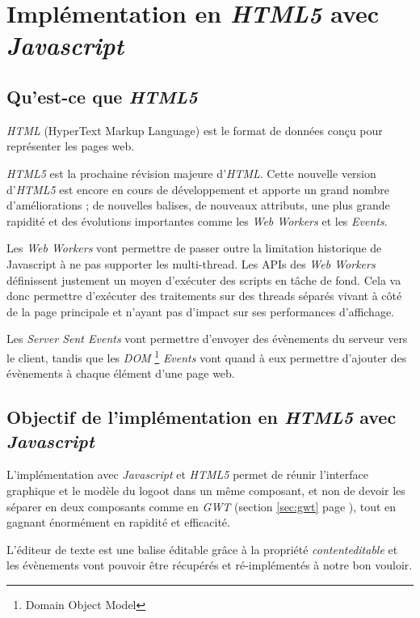 \section{Implémentation en \emph{HTML5} avec \emph{Javascript}}
	\label{sec:html5}
  \subsection{Qu'est-ce que \emph{HTML5}}
  
	\emph{HTML} (HyperText Markup Language) est le format de données conçu pour 
	représenter les pages web. 

	\emph{HTML5} est la prochaine révision majeure d'\emph{HTML}. 
	Cette nouvelle version d'\emph{HTML5} est encore en cours de 
	développement et apporte un grand nombre d'améliorations ; de nouvelles 
	balises, de nouveaux attributs, une plus grande rapidité et des	évolutions
	importantes comme les \emph{Web Workers} et les \emph{Events}.
	
	Les \emph{Web Workers} vont permettre de passer outre la limitation 
	historique de Javascript à ne pas supporter les multi-thread.
	Les APIs des \emph{Web Workers} définissent justement un moyen d’exécuter 
	des scripts en tâche de fond. Cela va donc permettre d’exécuter des 
	traitements sur des threads séparés vivant à côté de la page principale et 
	n’ayant pas d’impact sur ses performances d’affichage. 
	
	Les \emph{Server Sent Events} vont permettre d'envoyer des évènements du 
	serveur vers le client, tandis que les \emph{DOM}
	\footnote{Domain Object Model} \emph{Events} vont quand à eux	permettre 
	d'ajouter des évènements à chaque élément d'une page web.
	
	\subsection{Objectif de l'implémentation en \emph{HTML5} avec
		\emph{Javascript}}
	
	L'implémentation avec \emph{Javascript} et \emph{HTML5} permet de réunir 
	l'interface graphique et le modèle du logoot dans un même composant, et non de
	devoir les séparer en deux composants comme en \emph{GWT} (section \ref{sec:gwt}
  page \pageref{sec:gwt}), tout en 
	gagnant énormément en rapidité et efficacité.
	
	L'éditeur de texte est une balise éditable grâce à la propriété 
	\emph{contenteditable} et les évènements vont pouvoir être récupérés et 
	ré-implémentés à notre bon vouloir.
	
